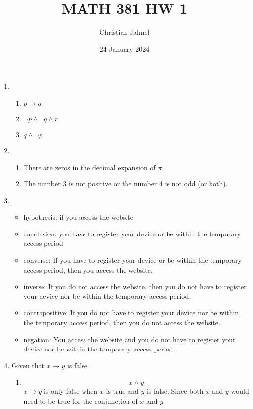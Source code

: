\documentclass[a4paper, 12pt]{article}
\title{MATH 381 HW 1}
\author{Christian Jahnel}
\date{24 January 2024}
\begin{document}
    \maketitle
    \begin{enumerate}
    \item \hfill
        \begin{enumerate}
        \item $p \rightarrow q$
        \item $\neg p \wedge \neg q \wedge r$
        \item $q \wedge \neg p$
        \end{enumerate}
    \item \hfill
        \begin{enumerate}
        \item There are zeros in the decimal expansion of $\pi$.
        \item The number 3 is not positive or the number 4 is not odd (or both).
        \end{enumerate}
    \item \hfill
        \begin{itemize}
        \item hypothesis: if you access the website
        \item conclusion: you have to register your device or be within the temporary access period
        \item converse: If you have to register your device or be within the temporary access period,
        then you access the website.
        \item inverse: If you do not access the website,
        then you do not have to register your device nor be within the temporary access period.
        \item contrapositive: If you do not have to register your device nor be within the temporary access period,
        then you do not access the website.
        \item negation: You access the website and you do not have to register your device nor be within the temporary access period.
        \end{itemize}
    \item Given that $x \rightarrow y$ is false
        \begin{enumerate}
        \item
            \[x \wedge y\]
            $x \rightarrow y$ is only false when $x$ is true and $y$ is false.
            Since both $x$ and $y$ would need to be true for the conjunction of $x$ and $y$

\end{enumerate}
\end{enumerate}
\end{document}

